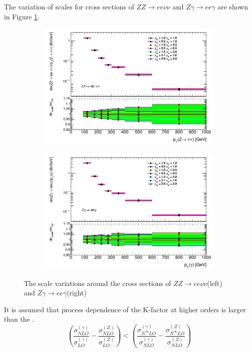 \documentclass[11pt,a4paper,openright,twoside]{report}
\begin{document}
The variation of scales for cross sections of $ZZ\to ee\nu\nu$ and $Z\gamma\to ee\gamma$ are shown in Figure \ref{fig:scale_xsec}.
\begin{figure}[H]
\centering
	\begin{subfigure}{0.49\textwidth}
		\includegraphics[width=\linewidth]{zz_scale.png}
	\end{subfigure}
	\begin{subfigure}{0.49\textwidth}
		\includegraphics[width=\linewidth]{zg_scale.png}
	\end{subfigure}
	\caption{The scale variations around the cross sections of $ZZ\to ee\nu\nu$(left) and $Z\gamma\to ee\gamma$(right)}
	\label{fig:scale_xsec}
\end{figure}

It is assumed that process dependence of the K-factor at higher orders is larger than the .
\begin{equation}
\left(\frac{\sigma^{(\gamma)}_{NLO}}{\sigma^{(\gamma)}_{LO}}-\frac{\sigma^{(Z)}_{NLO}}{\sigma^{(Z)}_{LO}}\right) <\left(\frac{\sigma^{(\gamma)}_{N^{\infty}LO}}{\sigma^{(\gamma)}_{NLO}}-\frac{\sigma^{(Z)}_{N^{\infty}LO}}{\sigma^{(Z)}_{NLO}}\right)
\end{equation}
\end{document}
